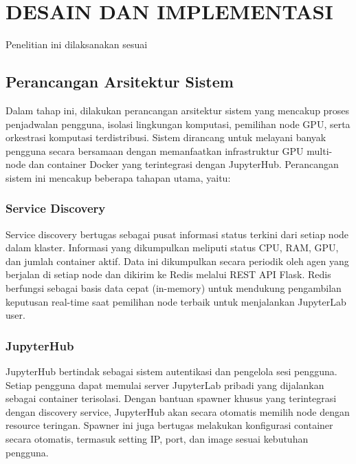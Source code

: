 \chapter{DESAIN DAN IMPLEMENTASI}
\label{chap:desainimplementasi}


Penelitian ini dilaksanakan sesuai \lipsum[1][1-5]

\section{Perancangan Arsitektur Sistem}
\label{sec:deskripsisistem}

Dalam tahap ini, dilakukan perancangan arsitektur sistem yang mencakup proses penjadwalan pengguna, isolasi lingkungan komputasi, pemilihan node GPU, serta orkestrasi komputasi terdistribusi. Sistem dirancang untuk melayani banyak pengguna secara bersamaan dengan memanfaatkan infrastruktur GPU multi-node dan container Docker yang terintegrasi dengan JupyterHub.
Perancangan sistem ini mencakup beberapa tahapan utama, yaitu:

\subsection{Service Discovery}

Service discovery bertugas sebagai pusat informasi status terkini dari setiap node dalam klaster. Informasi yang dikumpulkan meliputi status CPU, RAM, GPU, dan jumlah container aktif. Data ini dikumpulkan secara periodik oleh agen yang berjalan di setiap node dan dikirim ke Redis melalui REST API Flask. Redis berfungsi sebagai basis data cepat (in-memory) untuk mendukung pengambilan keputusan real-time saat pemilihan node terbaik untuk menjalankan JupyterLab user.

\subsection{JupyterHub}

JupyterHub bertindak sebagai sistem autentikasi dan pengelola sesi pengguna. Setiap pengguna dapat memulai server JupyterLab pribadi yang dijalankan sebagai container terisolasi. Dengan bantuan spawner khusus yang terintegrasi dengan discovery service, JupyterHub akan secara otomatis memilih node dengan resource teringan. Spawner ini juga bertugas melakukan konfigurasi container secara otomatis, termasuk setting IP, port, dan image sesuai kebutuhan pengguna.

